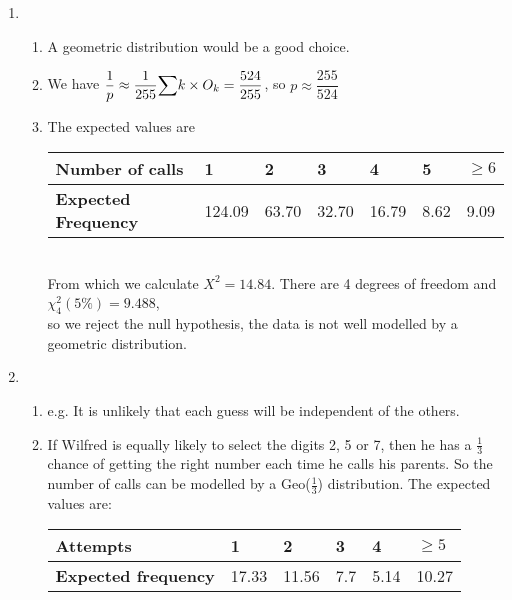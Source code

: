 \documentclass[fleqn]{article}
\begin{document}
\begin{enumerate}
    \item \begin{enumerate}[label=\bfseries \alph*\space ]
            \item A geometric distribution would be a good choice.
            \item We have $\dfrac{1}{p}\approx \dfrac{1}{255}{\mathlarger\sum}k \times O_k=\dfrac{524}{255}$, so $p\approx\dfrac{255}{524}$
            \item The expected values are \vspace{1mm}\\
                \begin{minipage}[t]{0.80\linewidth}
                    \begin{tabularx}{\textwidth}{|X|*6{P{12mm}|}}
                        \hline
                        \textbf{Number of calls}     & 1      & 2     & 3     & 4     & 5    & $\geq 6$   \\\hline
                        \textbf{Expected Frequency}  & 124.09 & 63.70 & 32.70 & 16.79 & 8.62 & 9.09       \\\hline
                    \end{tabularx}
                    \vspace{4mm}
                \end{minipage} \\
                From which we calculate $X^2=14.84$. There are 4 degrees of freedom and $\chi_4^2(5\%)=9.488$, \\so we reject the null hypothesis, the data is not well modelled by a geometric distribution.
        \end{enumerate}
    
    \item \begin{enumerate}[label=\bfseries \alph*\space ]
            \item e.g. It is unlikely that each guess will be independent of the others.
            \item If Wilfred is equally likely to select the digits 2, 5 or 7, then he has a $\tfrac{1}{3}$ chance of getting the right number each time he calls his parents. So the number of calls can be modelled by a Geo($\tfrac{1}{3}$) distribution. The expected values are: \vspace{1mm}\\
                \begin{tabularx}{0.65\textwidth}{|X|*5{P{12mm}|}}
                    \hline
                    \textbf{Attempts}             & 1     & 2     & 3   & 4    & $\geq5$     \\\hline
                    \textbf{Expected frequency}   & 17.33 & 11.56 & 7.7 & 5.14 & 10.27       \\\hline
                \end{tabularx}\vspace{4mm}
                

\end{enumerate}
\end{enumerate}
\end{document}
